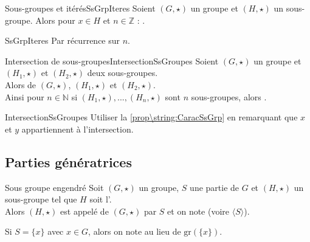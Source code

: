 \documentclass[12pt,a4paper]{report}
\begin{document}
    \begin{proposition}{Sous-groupes et itérés}{SsGrpIteres}
     Soient $(G, \star)$ un groupe et $(H, \star)$ un sous-groupe. Alors pour $x \in H$ et $n \in \mathbb{Z}$ : .
    \end{proposition}
    
    \begin{principedemo}{SsGrpIteres}
    Par récurrence sur $n$.
    \end{principedemo}
    
    \begin{proposition}{Intersection de sous-groupes}{IntersectionSsGroupes}
    Soient $(G, \star)$ un groupe et $(H_1, \star)$ et $(H_2, \star)$ deux sous-groupes.\\
     Alors  de $(G, \star)$, $(H_1, \star)$ et $(H_2, \star)$.\\
     Ainsi pour $n \in \mathbb{N}$ si $(H_1, \star), ..., (H_n, \star)$ sont $n$ sous-groupes, alors .
    \end{proposition}
    
    \begin{principedemo}{IntersectionSsGroupes}
    Utiliser la \cref{prop\string:CaracSsGrp}  en remarquant que $x$ et $y$ appartiennent à l'intersection.
    \end{principedemo}
    
    
    \subsection{Parties génératrices}
    
    \begin{definition}{Sous groupe engendré}{}
    Soit $(G, \star)$ un groupe, $S$ une partie de $G$ et $(H, \star)$ un sous-groupe tel que $H$ soit l'.\\
    Alors $(H, \star)$ est appelé  de $(G, \star)$  par $S$ et on note  (voire $\langle S \rangle$).
    \end{definition}
    
    \begin{remarque}
    Si $S = \lbrace x \rbrace$ avec $x \in G$, alors on note  au lieu de $\text{gr}\left(\lbrace x \rbrace\right)$.
    \end{remarque}
    
\end{document}
